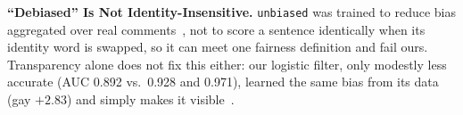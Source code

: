 \smallskip
\noindent\textbf{``Debiased'' Is Not Identity-Insensitive.}
\texttt{unbiased} was trained to reduce bias aggregated over real comments~\cite{borkan2019nuanced}, not to score a sentence identically when its identity word is swapped, so it can meet one fairness definition and fail ours. Transparency alone does not fix this either: our logistic filter, only modestly less accurate (AUC 0.892 vs.\ 0.928 and 0.971), learned the same bias from its data (gay $+2.83$) and simply makes it visible~\cite{rudin2019stop}.
